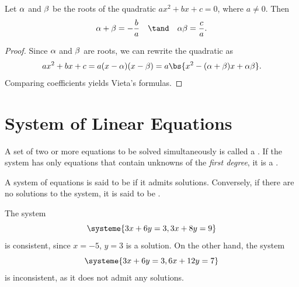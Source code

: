 \begin{proposition}
    Let $\alpha$ and $\beta$ be the roots of the quadratic $ax^2 + bx + c = 0$, where $a \neq 0$. Then \[\a + \b = -\frac{b}{a} \quad \tand \quad \a \b = \frac{c}{a}.\]
\end{proposition}
\begin{proof}
    Since $\alpha$ and $\beta$ are roots, we can rewrite the quadratic as \[ax^2 + bx + c = a(x - \a)(x - \b) = a\bs{x^2 - (\a + \b) x + \a\b}.\] Comparing coefficients yields Vieta's formulas.
\end{proof}

\section{System of Linear Equations}

\begin{definition}
    A set of two or more equations to be solved simultaneously is called a . If the system has only equations that contain unknowns of the \emph{first degree}, it is a .
\end{definition}

\begin{definition}
    A system of equations is said to be  if it admits solutions. Conversely, if there are no solutions to the system, it is said to be .
\end{definition}

\begin{example}
    The system \[\systeme{3x + 6y = 3,3x+8y=9}\] is consistent, since $x = -5$, $y = 3$ is a solution. On the other hand, the system \[\systeme{3x + 6y = 3, 6x + 12y = 7}\] is inconsistent, as it does not admit any solutions.
\end{example}

